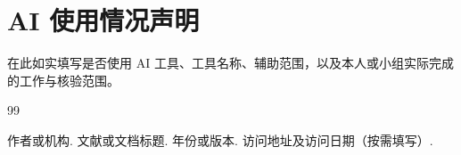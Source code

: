 \documentclass[UTF8,12pt,a4paper,fontset=fandol]{ctexart}
\begin{document}
\makereportcover
\reportfrontmatter

\begin{abstract}
在此概述实验目的、采用的方法、主要结果与结论。定稿时用实际实验内容替换本段；尚未执行的测试与尚未取得的数据应明确标注，不能当作已完成结果。
\end{abstract}
\clearpage
\tableofcontents
\clearpage
\reportmainmatter



\section*{AI 使用情况声明}
在此如实填写是否使用 AI 工具、工具名称、辅助范围，以及本人或小组实际完成的工作与核验范围。

\begin{thebibliography}{99}
 作者或机构. 文献或文档标题. 年份或版本. 访问地址及访问日期（按需填写）.
\end{thebibliography}
\end{document}
